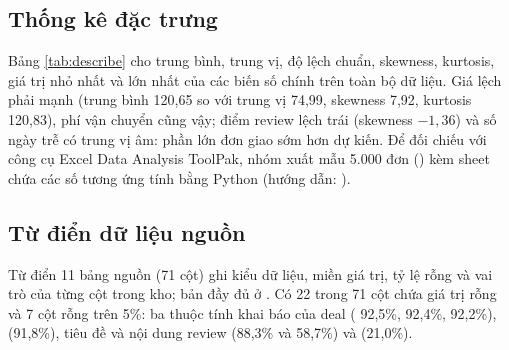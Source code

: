 \subsection{Thống kê đặc trưng}\label{sec:thong-ke}
Bảng \ref{tab:describe} cho trung bình, trung vị, độ lệch chuẩn, skewness, kurtosis, giá trị nhỏ nhất và lớn nhất của các biến số chính trên toàn bộ dữ liệu. Giá lệch phải mạnh (trung bình 120,65 so với trung vị 74,99, skewness 7,92, kurtosis 120,83), phí vận chuyển cũng vậy; điểm review lệch trái (skewness $-1{,}36$) và số ngày trễ có trung vị âm: phần lớn đơn giao sớm hơn dự kiến. Để đối chiếu với công cụ Excel Data Analysis ToolPak, nhóm xuất mẫu 5.000 đơn () kèm sheet  chứa các số tương ứng tính bằng Python (hướng dẫn: ).


\subsection{Từ điển dữ liệu nguồn}\label{sec:tu-dien-nguon}
Từ điển 11 bảng nguồn (71 cột) ghi kiểu dữ liệu, miền giá trị, tỷ lệ rỗng và vai trò của từng cột trong kho; bản đầy đủ ở . Có 22 trong 71 cột chứa giá trị rỗng và 7 cột rỗng trên 5\%: ba thuộc tính khai báo của deal ( 92,5\%,  92,4\%,  92,2\%),  (91,8\%), tiêu đề và nội dung review (88,3\% và 58,7\%) và  (21,0\%).
